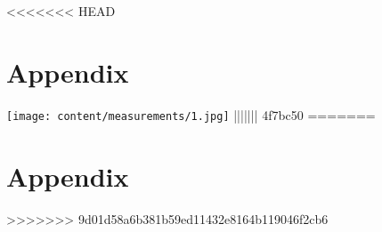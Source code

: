 <<<<<<< HEAD
\section*{Appendix}


\centering

\vfill
\texttt{[image: content/measurements/1.jpg]}
\vfill
||||||| 4f7bc50
=======
\section*{Appendix}
>>>>>>> 9d01d58a6b381b59ed11432e8164b119046f2cb6
